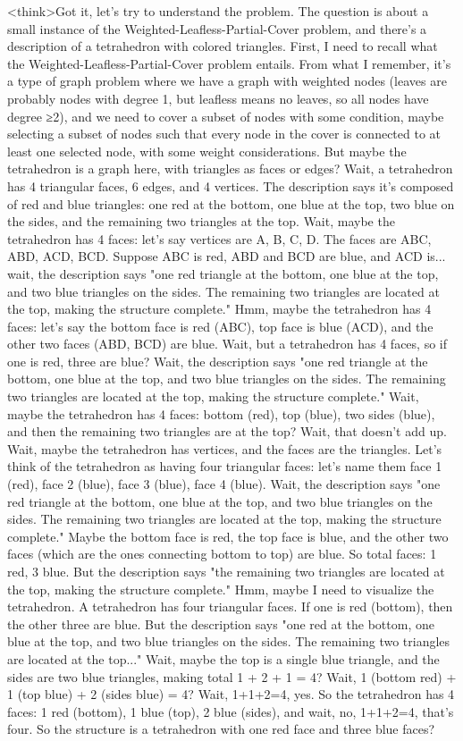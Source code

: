 <think>Got it, let's try to understand the problem. The question is about a small instance of the Weighted-Leafless-Partial-Cover problem, and there's a description of a tetrahedron with colored triangles. First, I need to recall what the Weighted-Leafless-Partial-Cover problem entails. From what I remember, it's a type of graph problem where we have a graph with weighted nodes (leaves are probably nodes with degree 1, but leafless means no leaves, so all nodes have degree ≥2), and we need to cover a subset of nodes with some condition, maybe selecting a subset of nodes such that every node in the cover is connected to at least one selected node, with some weight considerations. But maybe the tetrahedron is a graph here, with triangles as faces or edges? Wait, a tetrahedron has 4 triangular faces, 6 edges, and 4 vertices. The description says it's composed of red and blue triangles: one red at the bottom, one blue at the top, two blue on the sides, and the remaining two triangles at the top. Wait, maybe the tetrahedron has 4 faces: let's say vertices are A, B, C, D. The faces are ABC, ABD, ACD, BCD. Suppose ABC is red, ABD and BCD are blue, and ACD is... wait, the description says "one red triangle at the bottom, one blue at the top, and two blue triangles on the sides. The remaining two triangles are located at the top, making the structure complete." Hmm, maybe the tetrahedron has 4 faces: let's say the bottom face is red (ABC), top face is blue (ACD), and the other two faces (ABD, BCD) are blue. Wait, but a tetrahedron has 4 faces, so if one is red, three are blue? Wait, the description says "one red triangle at the bottom, one blue at the top, and two blue triangles on the sides. The remaining two triangles are located at the top, making the structure complete." Wait, maybe the tetrahedron has 4 faces: bottom (red), top (blue), two sides (blue), and then the remaining two triangles are at the top? Wait, that doesn't add up. Wait, maybe the tetrahedron has vertices, and the faces are the triangles. Let's think of the tetrahedron as having four triangular faces: let's name them face 1 (red), face 2 (blue), face 3 (blue), face 4 (blue). Wait, the description says "one red triangle at the bottom, one blue at the top, and two blue triangles on the sides. The remaining two triangles are located at the top, making the structure complete." Maybe the bottom face is red, the top face is blue, and the other two faces (which are the ones connecting bottom to top) are blue. So total faces: 1 red, 3 blue. But the description says "the remaining two triangles are located at the top, making the structure complete." Hmm, maybe I need to visualize the tetrahedron. A tetrahedron has four triangular faces. If one is red (bottom), then the other three are blue. But the description says "one red at the bottom, one blue at the top, and two blue triangles on the sides. The remaining two triangles are located at the top..." Wait, maybe the top is a single blue triangle, and the sides are two blue triangles, making total 1 + 2 + 1 = 4? Wait, 1 (bottom red) + 1 (top blue) + 2 (sides blue) = 4? Wait, 1+1+2=4, yes. So the tetrahedron has 4 faces: 1 red (bottom), 1 blue (top), 2 blue (sides), and wait, no, 1+1+2=4, that's four. So the structure is a tetrahedron with one red face and three blue faces? 